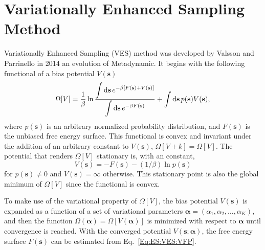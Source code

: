 \section{Variationally Enhanced Sampling Method\label{Sec:ES:VES}}
Variationally Enhanced Sampling (VES) method was developed by Valsson and Parrinello in 2014 an evolution of Metadynamic.\cite{ValssonPRL2014} It begins with the following functional of a bias potential $V(\mathbf{s})$
\begin{equation}
    \Omega[V]=\frac{1}{\beta} \ln \frac{\displaystyle\int \mathop{}\!\mathrm{d} \mathbf{s}\, e^{-\beta[F(\mathbf{s})+V(\mathbf{s})]}}{\displaystyle\int \mathop{}\!\mathrm{d} \mathbf{s}\, e^{-\beta F(\mathbf{s})}}+\int \mathop{}\!\mathrm{d} \mathbf{s}\, p(\mathbf{s}) V(\mathbf{s}),
\end{equation}
where $p(\mathbf{s})$ is an arbitrary normalized probability distribution, and $F(\mathbf{s})$ is the unbiased free energy surface. This functional is convex and invariant under the addition of an arbitrary constant to $V(\mathbf{s})$, $\Omega[V+k]=\Omega[V]$. The potential that renders $\Omega[V]$ stationary is, with an constant,
\begin{equation}
    V(\mathbf{s})=-F(\mathbf{s})-(1/\beta)\ln{p(\mathbf{s})}
    \label{Eq:ES:VES:VFP}
\end{equation}
for $p(\mathbf{s})\neq 0$ and $V(\mathbf{s})=\infty$ otherwise. This stationary point is also the global minimum of $\Omega[V]$ since the functional is convex.

To make use of the variational property of $\Omega[V]$, the bias potential $V(\mathbf{s})$ is expanded as a function of a set of variational parameters $\boldsymbol{\alpha}=(\alpha_1,\alpha_2,\dots,\alpha_K)$, and then the function $\Omega(\boldsymbol{\alpha})=\Omega[V(\boldsymbol{\alpha})]$ is minimized with respect to $\boldsymbol{\alpha}$ until convergence is reached. With the converged potential $V(\mathbf{s};\boldsymbol{\alpha})$, the free energy surface $F(\mathbf{s})$ can be estimated from Eq.~\ref{Eq:ES:VES:VFP}.

